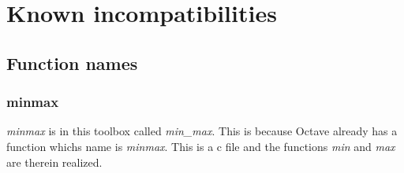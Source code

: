\section{Known incompatibilities}
\label{chap:intro:sec:knownIncompatibilities}


\subsection{Function names}

\subsubsection{minmax}
\textit{minmax} is in this toolbox called \textit{min\_max}. This is because Octave already has
a function whichs name is \textit{minmax}. This is a c file and the functions \textit{min} and \textit{max} are therein realized.


